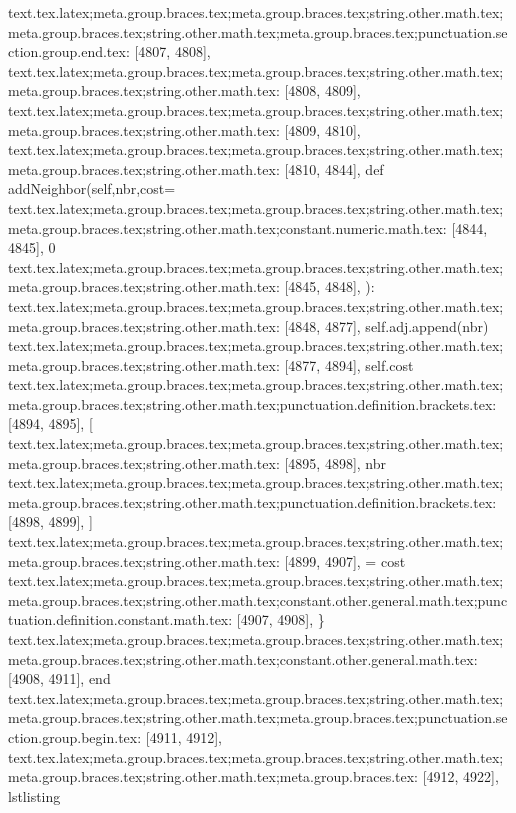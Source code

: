 {{{{{{{{{{{{{{{{{{{{{{{{{{{{{{{{{{{{{{{{{{{{{{{{{{{{{{{{{{{{{{{{{{{{{{{{{{{{{{{{{{{{{{{{{{{{{{{{{{{{{{{{{{{{{{{{{{{{{{{{{{{{{{{{{{{{{{{{{{{{{{{{{text.tex.latex;meta.group.braces.tex;meta.group.braces.tex;string.other.math.tex;meta.group.braces.tex;string.other.math.tex;meta.group.braces.tex;punctuation.section.group.end.tex: [4807, 4808], {}}
text.tex.latex;meta.group.braces.tex;meta.group.braces.tex;string.other.math.tex;meta.group.braces.tex;string.other.math.tex: [4808, 4809], {
}
text.tex.latex;meta.group.braces.tex;meta.group.braces.tex;string.other.math.tex;meta.group.braces.tex;string.other.math.tex: [4809, 4810], {
}
text.tex.latex;meta.group.braces.tex;meta.group.braces.tex;string.other.math.tex;meta.group.braces.tex;string.other.math.tex: [4810, 4844], {    def addNeighbor(self,nbr,cost=}
text.tex.latex;meta.group.braces.tex;meta.group.braces.tex;string.other.math.tex;meta.group.braces.tex;string.other.math.tex;constant.numeric.math.tex: [4844, 4845], {0}
text.tex.latex;meta.group.braces.tex;meta.group.braces.tex;string.other.math.tex;meta.group.braces.tex;string.other.math.tex: [4845, 4848], {):
}
text.tex.latex;meta.group.braces.tex;meta.group.braces.tex;string.other.math.tex;meta.group.braces.tex;string.other.math.tex: [4848, 4877], {        self.adj.append(nbr)
}
text.tex.latex;meta.group.braces.tex;meta.group.braces.tex;string.other.math.tex;meta.group.braces.tex;string.other.math.tex: [4877, 4894], {        self.cost}
text.tex.latex;meta.group.braces.tex;meta.group.braces.tex;string.other.math.tex;meta.group.braces.tex;string.other.math.tex;punctuation.definition.brackets.tex: [4894, 4895], {[}
text.tex.latex;meta.group.braces.tex;meta.group.braces.tex;string.other.math.tex;meta.group.braces.tex;string.other.math.tex: [4895, 4898], {nbr}
text.tex.latex;meta.group.braces.tex;meta.group.braces.tex;string.other.math.tex;meta.group.braces.tex;string.other.math.tex;punctuation.definition.brackets.tex: [4898, 4899], {]}
text.tex.latex;meta.group.braces.tex;meta.group.braces.tex;string.other.math.tex;meta.group.braces.tex;string.other.math.tex: [4899, 4907], { = cost
}
text.tex.latex;meta.group.braces.tex;meta.group.braces.tex;string.other.math.tex;meta.group.braces.tex;string.other.math.tex;constant.other.general.math.tex;punctuation.definition.constant.math.tex: [4907, 4908], {\}
text.tex.latex;meta.group.braces.tex;meta.group.braces.tex;string.other.math.tex;meta.group.braces.tex;string.other.math.tex;constant.other.general.math.tex: [4908, 4911], {end}
text.tex.latex;meta.group.braces.tex;meta.group.braces.tex;string.other.math.tex;meta.group.braces.tex;string.other.math.tex;meta.group.braces.tex;punctuation.section.group.begin.tex: [4911, 4912], {{}
text.tex.latex;meta.group.braces.tex;meta.group.braces.tex;string.other.math.tex;meta.group.braces.tex;string.other.math.tex;meta.group.braces.tex: [4912, 4922], {lstlisting}
}}}}}}}}}}}}}}}}}}}}}}}}}}}}}}}}}}}}}}}}}}}}}}}}}}}}}}}}}}}}}}}}}}}}}}}}}}}}}}}}}}}}}}}}}}}}}}}}}}}}}}}}}}}}}}}}}}}}}}}}}}}}}}}}}}}}}}}}}}}}}}}}}}
